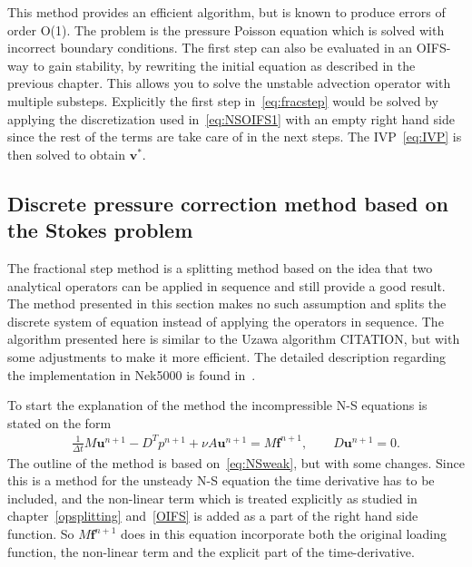 This method provides an efficient algorithm, but is known to produce errors of order O(1).
The problem is the pressure Poisson equation which is solved with incorrect boundary 
conditions. The first step can also be evaluated in an OIFS-way to gain stability,
by rewriting the initial equation as described in the previous chapter. This allows you 
to solve the unstable advection operator with multiple substeps. Explicitly the first step 
in~\ref{eq:fracstep} would be solved by applying the discretization used in~\ref{eq:NSOIFS1}
with an empty right hand side since the rest of the terms are take care of in the next steps. 
The IVP~\ref{eq:IVP} is then solved to obtain $\mathbf{v}^{*}$.


\subsection{Discrete pressure correction method based on the Stokes problem} \label{prescorr}
The fractional step method is a splitting method based on the idea that two analytical 
operators can be applied in sequence and still provide a good result. The method presented 
in this section makes no such assumption and splits the discrete system of equation instead 
of applying the operators in sequence. The algorithm presented here is similar to the Uzawa
algorithm CITATION, but with some adjustments to make it more efficient. The detailed 
description regarding the implementation in Nek5000 is found
in~\cite{Fischer_hybridschwarz-multigrid}.

To start the explanation of the method the incompressible N-S equations is stated on the form
\begin{align}
    \frac{1}{\Delta t} M \mathbf{u}^{n+1}-D^Tp^{n+1}+\nu A \mathbf{u}^{n+1} = M\mathbf{f}^{n+1},
    \qquad D\mathbf{u}^{n+1}    = 0.
    \label{eq:DiscreteStart}
\end{align}
The outline of the method is based on~\ref{eq:NSweak}, but with some changes. Since this 
is a method for the unsteady N-S equation the time derivative has to be included, and the 
non-linear term which is treated explicitly as studied in chapter~\ref{opsplitting} and~\ref{OIFS}
is added as a part of the right hand side function. So $M\mathbf{f}^{n+1}$ does in this equation 
incorporate both the original loading function, the non-linear term and the explicit part of the 
time-derivative. 

